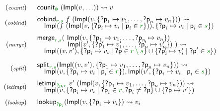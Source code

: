 \begin{figure}[h!]
\begin{equation*}
\begin{array}{rl}
{\footnotesize(\emph{counit})} & \begin{array}{l}
\ident{counit}_{\cclrd{ \emptyset }}~(\ident{Impl} (v, \ldots))   \rightsquigarrow v
\end{array}
\\[0.5em]
{\footnotesize(\emph{cobind})} & \begin{array}{l}
\ident{cobind}_{\cclrd{r}, \cclrd{s}}~f~(\ident{Impl}(v, \{ \ident{?p}_1 \mapsto v_1, \ldots, \ident{?p}_{n}\mapsto v_n \})) \rightsquigarrow
\\[-0.25em]
\quad \ident{Impl}(f~(\ident{Impl}(v, \{ \ident{?p}_i \mapsto v_i \;|\; \ident{p}_i \in \cclrd{r} \} )), \{ \ident{?p}_i \mapsto v_i \;|\; \ident{p}_i \in \cclrd{s} \} )
\end{array}
\\[1em]
{\footnotesize(\emph{merge})} & \begin{array}{l}
\ident{merge}_{\cclrd{r}, \cclrd{s}}
              (~\ident{Impl}(v, \{ \ident{?p}_1 \mapsto v_1, \ldots, \ident{?p}_{n}\mapsto v_n \})  \\[-0.25em]
\hspace{4.4em}    \ident{Impl}(v', \{ \ident{?p}'_1 \mapsto v'_1, \ldots, \ident{?p}'_{n}\mapsto v'_n \})~) \rightsquigarrow \\[-0.25em]
\quad \ident{Impl}((v, v'), \{ \ident{?p}_i \mapsto v_i \;|\; \ident{?p}\in\cclrd{r \setminus s}  \} \cup \{ \ident{?p}'_i \mapsto v'_i \;|\; \ident{?p}'\in\cclrd{s}  \})
\end{array}
\\[1.75em]
{\footnotesize(\emph{split})} & \begin{array}{l}
\ident{split}_{\cclrd{r}, \cclrd{s}} (\ident{Impl}((v,v'), \{ \ident{?p}_1 \mapsto v_1, \ldots, \ident{?p}_{n}\mapsto v_n \}))  \rightsquigarrow
\\[-0.25em]
\quad \ident{Impl}(v, \{ \ident{?p}_i \mapsto v_i \;|\; \ident{p}_i \in \cclrd{r} \} ), \ident{Impl}(v', \{ \ident{?p}_i \mapsto v_i \;|\; \ident{p}_i \in \cclrd{s} \} )
\end{array}
\\[1em]
{\footnotesize(\emph{letimpl})} & \begin{array}{l}
\ident{letimpl}_{\cclrd{\ident{?p}}, \cclrd{r}}~v'~(\ident{Impl}(v, \{ \ident{?p}_1 \mapsto v_1, \ldots, \ident{?p}_{n}\mapsto v_n \}))  \rightsquigarrow
\\[-0.25em]
\quad \ident{Impl}(v, \{ \ident{?p}_i \mapsto v_i\;|\; \ident{?p}_i \in \cclrd{r}, \ident{?p}_i \neq \ident{?p} \} \cup \{ \ident{?p} \mapsto v' \} )
\end{array}
\\[1em]
{\footnotesize(\emph{lookup})} & \begin{array}{l}
\ident{lookup}_{\cclrd{\ident{?p}_i}} (\ident{Impl}(v, \{\ident{?p}_i\mapsto v_i\}) \rightsquigarrow v_i
\end{array}
\end{array}
\end{equation*}


\end{figure}
